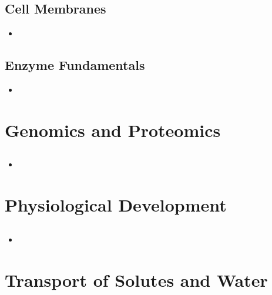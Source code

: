 \documentclass[12pt,a4paper]{article}
\begin{document}
\subsection{Cell Membranes}
\begin{itemize}
    \item 
\end{itemize}

\subsection{Enzyme Fundamentals}
\begin{itemize}
    \item 
\end{itemize}

\clearpage
\section{Genomics and Proteomics}
\subsection{}
\begin{itemize}
    \item 
\end{itemize}

\clearpage
\section{Physiological Development}
\subsection{}
\begin{itemize}
    \item 
\end{itemize}

\clearpage
\section{Transport of Solutes and Water}
\end{document}
